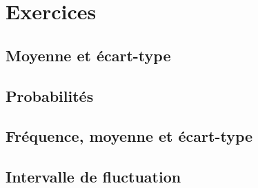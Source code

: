 \section{Exercices}

\subsection{Moyenne et écart-type}


\subsection{Probabilités}


\subsection{Fréquence, moyenne et écart-type}


\subsection{Intervalle de fluctuation}

